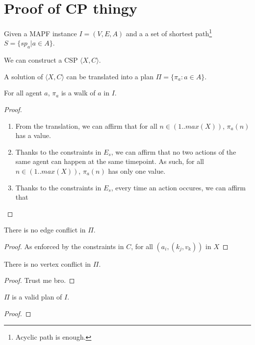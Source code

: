 \section{Proof of CP thingy}

Given a MAPF instance $I=(V,E,A)$ and a a set of shortest path\footnote{Acyclic path is enough.} $S = \{sp_a | a \in A \}$.

We can construct a CSP $\langle X,C \rangle$.

A solution of $\langle X,C \rangle$ can be translated into a plan $\Pi = \{\pi_a : a \in A\}$.


  \begin{lemma}
    For all agent $a$, $\pi_a$ is a walk of $a$ in $I$.
  \end{lemma}
  \begin{proof}
    \begin{enumerate}
      \item From the translation, we can affirm that for all $n \in (1..max(X))$, $\pi_a(n)$ has a value.
      \item Thanks to the constraints in $E_s$, we can affirm that no two actions of the same agent can happen at the same timepoint. As such, for all $n \in (1..max(X))$, $\pi_a(n)$ has only one value.
      \item Thanks to the constraints in $E_s$, every time an action occures, we can affirm that
    \end{enumerate}
  \end{proof}
  \begin{lemma}
    There is no edge conflict in $\Pi$.
  \end{lemma}
  \begin{proof}
    As enforced by the constraints in $C$, for all $(a_i,(k_j,v_k))$ in $X$
  \end{proof}
  \begin{lemma}
    There is no vertex conflict in $\Pi$.
  \end{lemma}
  \begin{proof}
    Trust me bro.
  \end{proof}

\begin{theorem}
$\Pi$ is a valid plan of $I$.
\end{theorem}

\begin{proof}
\end{proof}
